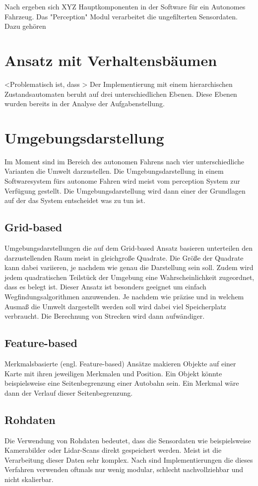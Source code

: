 Nach \cite{JUN14} ergeben sich XYZ Hauptkomponenten in der Software für ein Autonomes Fahrzeug.
Das "Perception" Modul verarbeitet die ungefilterten Sensordaten. Dazu gehören  


\section{Ansatz mit Verhaltensbäumen}
<Problematisch ist, dass >
Der Implementierung mit einem hierarchischen Zustandsautomaten beruht auf drei unterschiedlichen Ebenen. Diese Ebenen wurden bereits in der Analyse der Aufgabenstellung.

\section{Umgebungsdarstellung}
Im Moment sind im Bereich des autonomen Fahrens nach \cite{ILI19} vier unterschiedliche Varianten die Umwelt darzustellen. Die Umgebungsdarstellung in einem Softwaresystem fürs autonome Fahren wird meist vom perception System zur Verfügung gestellt. Die Umgebungsdarstellung wird dann einer der Grundlagen auf der das System entscheidet was zu tun ist.

\subsection{Grid-based}
Umgebungsdarstellungen die auf dem Grid-based Ansatz basieren unterteilen den darzustellenden Raum meist in gleichgroße Quadrate. Die Größe der Quadrate kann dabei variieren, je nachdem wie genau die Darstellung sein soll. Zudem wird jedem quadratischen Teilstück der Umgebung eine Wahrscheinlichkeit zugeordnet, dass es belegt ist. 
Dieser Ansatz ist besonders geeignet um einfach Wegfindungsalgorithmen anzuwenden.
Je nachdem wie präzise und in welchem Ausmaß die Umwelt dargestellt werden soll wird dabei viel Speicherplatz verbraucht. Die Berechnung von Strecken wird dann aufwändiger.

\subsection{Feature-based}
Merkmalsbasierte (engl. Feature-based) Ansätze makieren Objekte auf einer Karte mit ihren jeweiligen Merkmalen und Position. Ein Objekt könnte beispielsweise eine Seitenbegrenzung einer Autobahn sein. Ein Merkmal wäre dann der Verlauf dieser Seitenbegrenzung.

\subsection{Rohdaten}
Die Verwendung von Rohdaten bedeutet, dass die Sensordaten wie beispielsweise Kamerabilder oder Lidar-Scans direkt gespeichert werden. Meist ist die Verarbeitung dieser Daten sehr komplex. Nach \cite{ILI19} sind Implementierungen die dieses Verfahren verwenden oftmals nur wenig modular, schlecht nachvollziehbar und nicht skalierbar.

